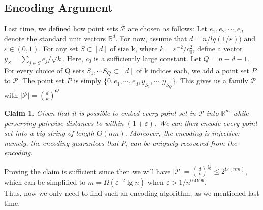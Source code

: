 \documentclass[11pt]{article}
\newcommand{\eps}{\varepsilon}
\newcommand{\R}{\mathbb{R}}
\newtheorem{claim}[theorem]{Claim}
\begin{document}
\subsection{Encoding Argument}
Last time, we defined how point sets $\mathcal{P}$ are chosen as follows: Let $e_1, e_2, \cdots, e_d$ denote the standard unit vectors $\R^d$. For now, assume that $d = n/lg(1/\eps))$ and $\eps \in (0, 1)$. For any set $S \subset [d]$ of size k, where $k = \eps^{-2}/c_0^2$, define a vector $y_S = \sum_{j\in S} e_j/\sqrt{k}$. Here, $c_0$ is a sufficiently large constant. Let $Q = n - d - 1$. For every choice of Q sets $S_1, \cdots S_Q \subset [d]$ of k indices each, we add a point set $P$ to $\mathcal{P}$. The point set $P$ is simply $\{0, e_1, \cdots, e_d, y_{S_1}, \cdots, y_{S_Q}\}$. This gives us a family $\mathcal{P}$ with $|\mathcal{P}| = {d \choose k}^Q$ 
\begin{claim}
	Given that it is possible to embed every point set in $\mathcal{P}$ into $\R^m$ while perserving pairwise distances to within $(1+\eps)$. We can then encode every point set into a big string of length $O(nm)$. Moreover, the encoding is injective: namely, the encoding guarantees that $P_i$ can be uniquely recovered from the encoding. 
\end{claim}
Proving the claim is sufficient since then we will have $|\mathcal{P}| = {d \choose k}^Q \leq 2^{O(nm)}$, which can be simplified to $m = \Omega(\eps^{-2}\lg n)$ when $\eps > 1/n^{0.4999}$. \\
Thus, now we only need to find such an encoding algorithm, as we mentioned last time.
\end{document}
